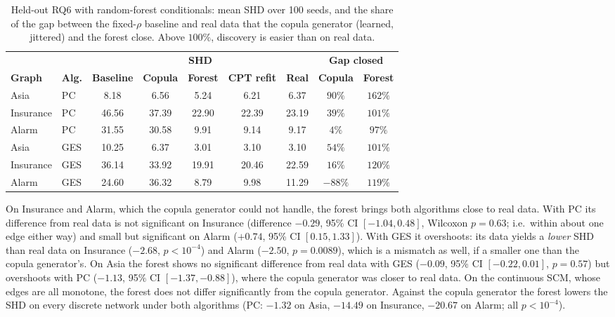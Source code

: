 \documentclass[
  english,
  class=report,
  accentcolor=2c,
  marginpar=false,
  parskip=half-,
  fontsize=11pt,
  ruledheaders=false,
  pdfa=false,
  IMRAD=false,
  thesis={type=master}
]{tudapub}
\begin{document}
\begin{table}[ht]
\caption{Held-out RQ6 with random-forest conditionals: mean SHD over 100 seeds, and the share of the gap between the fixed-$\rho$ baseline and real data that the copula generator (learned, jittered) and the forest close. Above $100\%$, discovery is easier than on real data.}
\label{tab:rf}
\centering
\small
\begin{tabular}{llccccccc}
\toprule
 & & \multicolumn{5}{c}{\textbf{SHD}} & \multicolumn{2}{c}{\textbf{Gap closed}} \\
\cmidrule(lr){3-7} \cmidrule(lr){8-9}
\textbf{Graph} & \textbf{Alg.} & \textbf{Baseline} & \textbf{Copula} & \textbf{Forest} & \textbf{CPT refit} & \textbf{Real} & \textbf{Copula} & \textbf{Forest} \\
\midrule
Asia & PC & 8.18 & 6.56 & 5.24 & 6.21 & 6.37 & $90\%$ & $162\%$ \\
Insurance & PC & 46.56 & 37.39 & 22.90 & 22.39 & 23.19 & $39\%$ & $101\%$ \\
Alarm & PC & 31.55 & 30.58 & 9.91 & 9.14 & 9.17 & $4\%$ & $97\%$ \\
\addlinespace
Asia & GES & 10.25 & 6.37 & 3.01 & 3.10 & 3.10 & $54\%$ & $101\%$ \\
Insurance & GES & 36.14 & 33.92 & 19.91 & 20.46 & 22.59 & $16\%$ & $120\%$ \\
Alarm & GES & 24.60 & 36.32 & 8.79 & 9.98 & 11.29 & $-88\%$ & $119\%$ \\
\bottomrule
\end{tabular}
\end{table}

On Insurance and Alarm, which the copula generator could not handle, the
forest brings both algorithms close to real data. With PC its difference
from real data is not significant on Insurance (difference
$-0.29$, 95\% CI $[-1.04, 0.48]$, Wilcoxon
$p = 0.63$; i.e.\ within about one edge either way) and small but significant on Alarm
($+0.74$, 95\% CI $[0.15, 1.33]$). With GES it overshoots: its
data yields a \emph{lower} SHD than real data on Insurance
($-2.68$, $p < 10^{-4}$) and Alarm
($-2.50$, $p = 0.0089$), which is a mismatch as
well, if a smaller one than the copula generator's. On Asia the forest
shows no significant difference from real data with GES ($-0.09$,
95\% CI $[-0.22, 0.01]$, $p = 0.57$) but
overshoots with PC ($-1.13$, 95\% CI $[-1.37, -0.88]$), where the copula
generator was closer to real data. On the continuous SCM, whose edges
are all monotone, the forest does not differ significantly from the copula
generator. Against the copula generator the forest lowers the SHD on every
discrete network under both algorithms (PC: $-1.32$ on Asia,
$-14.49$ on Insurance, $-20.67$ on Alarm; all
$p < 10^{-4}$).
\end{document}
